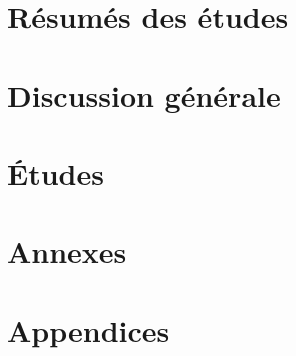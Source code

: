 \documentclass[a4paper,oneside,nobind]{thesis}
\begin{document}
    \part{Résumés des études}
    \label{part:studies}
    
    \thispagestyle{empty}
    
    \thispagestyle{empty}
    
    \thispagestyle{empty}
    
    
    \part{Discussion générale}
    \label{part:discussion}
    



    \part{Études}
    \thispagestyle{empty}
    
    \thispagestyle{empty}
    
    \thispagestyle{empty}
    
    \thispagestyle{empty}
    
    \part{Annexes}
    \label{part:annexes}
    
    
    
    
    


    \part{Appendices}

    \thispagestyle{empty}
    \newpage

    \thispagestyle{empty}
    
    \thispagestyle{empty}
    
    
\end{document}
